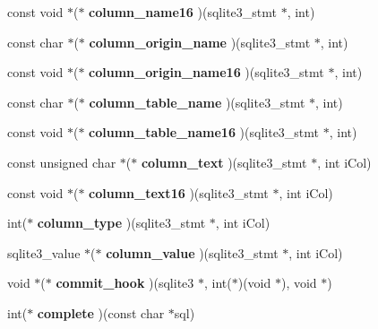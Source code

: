 \begin{CompactItemize}
\item 
const void $\ast$($\ast$ \textbf{column\_\-name16} )(sqlite3\_\-stmt $\ast$, int)\label{structsqlite3__api__routines_fce883abe254baded5b3c190d5504d3b}

\item 
const char $\ast$($\ast$ \textbf{column\_\-origin\_\-name} )(sqlite3\_\-stmt $\ast$, int)\label{structsqlite3__api__routines_b9ef4b94066c03896867cd3eb2d46a44}

\item 
const void $\ast$($\ast$ \textbf{column\_\-origin\_\-name16} )(sqlite3\_\-stmt $\ast$, int)\label{structsqlite3__api__routines_ccef16dde46cff11a2f6d08ab94bd932}

\item 
const char $\ast$($\ast$ \textbf{column\_\-table\_\-name} )(sqlite3\_\-stmt $\ast$, int)\label{structsqlite3__api__routines_125f3bd7b214f90e5bd227306c1d95a9}

\item 
const void $\ast$($\ast$ \textbf{column\_\-table\_\-name16} )(sqlite3\_\-stmt $\ast$, int)\label{structsqlite3__api__routines_dfa56aa5c054beb26b3d8349b3567d94}

\item 
const unsigned char $\ast$($\ast$ \textbf{column\_\-text} )(sqlite3\_\-stmt $\ast$, int iCol)\label{structsqlite3__api__routines_6ac63f3249346b8ee37a6cfa58446b2a}

\item 
const void $\ast$($\ast$ \textbf{column\_\-text16} )(sqlite3\_\-stmt $\ast$, int iCol)\label{structsqlite3__api__routines_02068b3d4f675c884583c5f8616bc88a}

\item 
int($\ast$ \textbf{column\_\-type} )(sqlite3\_\-stmt $\ast$, int iCol)\label{structsqlite3__api__routines_77ff781fca9180fee79824796056da5c}

\item 
sqlite3\_\-value $\ast$($\ast$ \textbf{column\_\-value} )(sqlite3\_\-stmt $\ast$, int iCol)\label{structsqlite3__api__routines_eeffe0610fed9bfb6747671a10be60aa}

\item 
void $\ast$($\ast$ \textbf{commit\_\-hook} )(sqlite3 $\ast$, int($\ast$)(void $\ast$), void $\ast$)\label{structsqlite3__api__routines_e7b3d173267ff39b850ef7db9f9f7536}

\item 
int($\ast$ \textbf{complete} )(const char $\ast$sql)\label{structsqlite3__api__routines_1b63e29169449d94c6d1cbb46135532e}


\end{CompactItemize}
